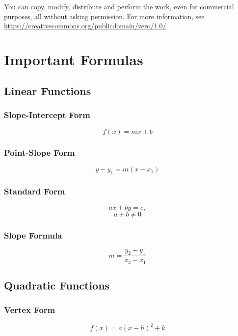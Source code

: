 \documentclass{book}
\begin{document}
You can copy, modify, distribute and perform the work, even for commercial purposes, all without asking permission. For more information, see \url{https://creativecommons.org/publicdomain/zero/1.0/}.

\tableofcontents %

\newpage

\chapter{Important Formulas} %
\section{Linear Functions}
\subsection{Slope-Intercept Form}
\begin{equation} 
    f(x) = mx + b
\end{equation}

\subsection{Point-Slope Form}
\begin{equation}
    y-y_1 = m(x - x_1)
\end{equation}
\subsection{Standard Form}
\begin{equation}
    ax+by = c,
\end{equation}
\begin{equation}
    a+b \neq 0 
\end{equation}
\subsection{Slope Formula}
\begin{equation}
    m = \frac{y_2 - y_1}{x_2 - x_1}
\end{equation}

\section{Quadratic Functions}
\subsection{Vertex Form}
\begin{equation}
    f(x) = a(x-h)^2 + k
\end{equation}
\end{document}
